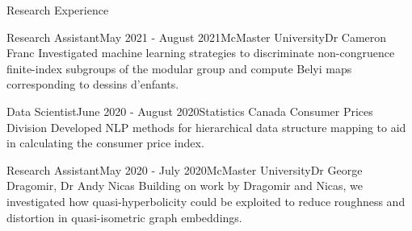 \begin{rSection}{Research Experience}



\begin{rSubsection}{Research Assistant}{May 2021 - August 2021}{McMaster University}{Dr Cameron Franc}
	Investigated machine learning strategies to discriminate non-congruence finite-index subgroups of the modular group and compute Belyi maps corresponding to dessins d'enfants.
\end{rSubsection}

\begin{rSubsection}{Data Scientist}{June 2020 - August 2020}{Statistics Canada }{Consumer Prices Division}
	Developed NLP methods for hierarchical data structure mapping to aid in calculating the consumer price index.
\end{rSubsection}


\begin{rSubsection}{Research Assistant}{May 2020 - July 2020}{McMaster University}{Dr George Dragomir, Dr Andy Nicas}
	Building on work by Dragomir and Nicas, we investigated how quasi-hyperbolicity could be exploited to reduce roughness and distortion in quasi-isometric graph embeddings.
\end{rSubsection}




\end{rSection}

